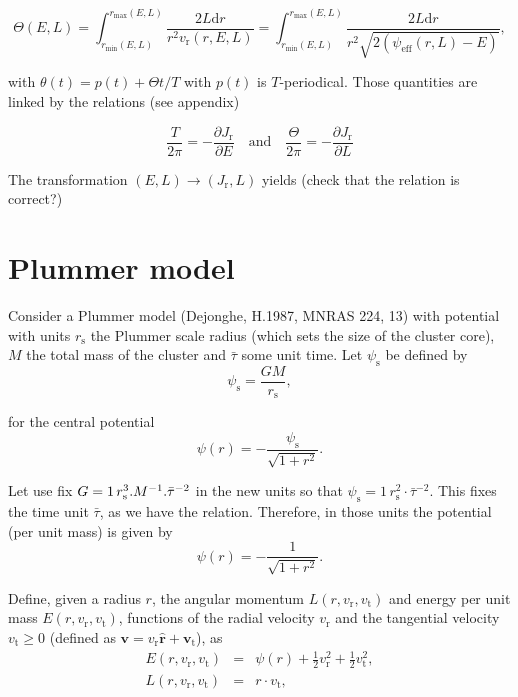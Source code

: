\documentclass[11pt]{article}
\newcommand{\rs}{\mathrm{s}}
\newcommand{\rt}{\mathrm{t}}
\newcommand{\rr}{\mathrm{r}}
\newcommand{\psis}{\psi_{\rs}}
\newcommand{\vr}{v_{\rr}}
\newcommand{\vt}{v_{\rt}}
\newcommand{\bv}{\boldsymbol{v}}
\newcommand{\bvt}{\boldsymbol{v}_{\mathrm{t}}}
\newcommand{\br}{\boldsymbol{r}}
\newcommand{\hr}{\hat{\br}}
\newcommand{\rd}{{\mathrm{d}}}
\newcommand{\rmax}{r_{\max}}
\newcommand{\rmin}{r_{\min}}
\newcommand{\psieff}{\psi_{\mathrm{eff}}}
\newcommand{\Jr}{J_{\mathrm{r}}}
\begin{document}
\begin{equation}
  \Theta(E,L)=   \int_{\rmin(E,L)}^{\rmax(E,L)} \frac{2 L \rd r}{r^{2}\vr(r,E,L)} =   \int_{\rmin(E,L)}^{\rmax(E,L)} \frac{2 L \rd r}{r^{2}\sqrt{2(\psieff(r,L)-E)}}, 
  \label{eq:Apsidal_angle}
\end{equation}

with $\theta(t) = p(t) + \Theta t/T$ with $p(t)$ is $T$-periodical.
Those quantities are linked by the relations  (see appendix)

\begin{equation}
  \frac{T}{2\pi} = -\frac{\partial \Jr}{\partial E}\quad \mathrm{and} \quad
  \frac{\Theta}{2\pi} = -\frac{\partial \Jr}{\partial L}
  \label{eq:dJr}
\end{equation}

The transformation $(E,L) \rightarrow (\Jr,L)$ yields (check that the relation is correct?)

\section{Plummer model}
\label{sec:Plummer}

  Consider a Plummer model (Dejonghe, H.1987, MNRAS 224, 13) with potential
with units $r_{\rs}$ the Plummer scale radius (which sets the size
of the cluster core), $M$ the total mass of the cluster and $\bar{\tau}$
some unit time. Let $\psis$ be defined by
\begin{equation}
\psis = \frac{G M}{r_{\rs}} ,
\label{eq:def_psi_s}
\end{equation}

for the central potential
\begin{equation}
\psi(r)=-\frac{\psis}{\sqrt{1+r^{2}}} .
\label{eq:def_potential}
\end{equation}

Let use fix $G=1\,r_{\rs}^{3}.M^{-1}.{\rm \bar{\tau}^{-2}}$ in the
new units so that $\psis=1\,r_{\rs}^{2}\cdot\bar{\tau}^{-2}$. This
fixes the time unit $\bar{\tau}$, as we have the relation. Therefore, in
those units the potential (per unit mass) is given by
\begin{equation}
\psi(r)=-\frac{1}{\sqrt{1+r^{2}}} .
\label{eq:def_potential_new_units}
\end{equation}

Define, given a radius $r$, the angular momentum $L(r,\vr,\vt)$
and energy per unit mass $E(r,\vr,\vt)$, functions of
the radial velocity $\vr$ and the tangential velocity $\vt\geq 0$
(defined as $\bv=\vr \hr + \bvt$),
as
\begin{equation}
\begin{array}{ccl}
E(r,\vr,\vt) & = & \psi(r)+\frac{1}{2} \vr^{2}+\frac{1}{2}\vt^{2} ,\\
L(r,\vr,\vt) & = & r \cdot \vt ,
\end{array}
\label{eq:v_to_E_L}
\end{equation}
\end{document}
